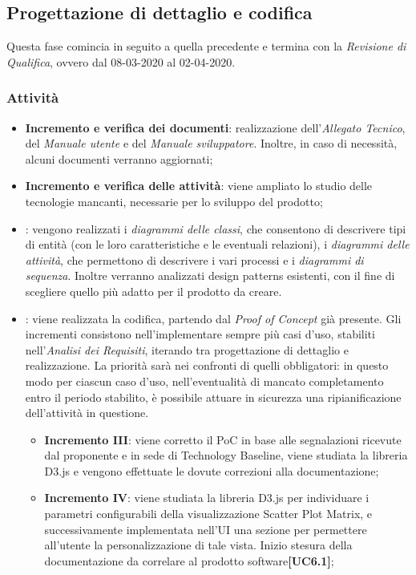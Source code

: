 \subsection{Progettazione di dettaglio e codifica}
Questa fase comincia in seguito a quella precedente e termina con la \textit{Revisione di Qualifica}, ovvero dal 08-03-2020 al 02-04-2020.

\subsubsection{Attività}
\begin{itemize}
	\item \textbf{Incremento e verifica dei documenti}: realizzazione dell'\textit{Allegato Tecnico}, del \textit{Manuale utente} e del \textit{Manuale sviluppatore}. Inoltre, in caso di necessità, alcuni documenti verranno aggiornati;
	\item \textbf{Incremento e verifica delle attività}: viene ampliato lo studio delle tecnologie mancanti, necessarie per lo sviluppo del prodotto; 
	\item \textbf{}: vengono realizzati i \textit{diagrammi delle classi}, che consentono di descrivere tipi di entità (con le loro caratteristiche e le eventuali relazioni), i \textit{diagrammi delle attività}, che permettono di descrivere i vari processi e i \textit{diagrammi di sequenza}. Inoltre verranno analizzati design patterns esistenti, con il fine di scegliere quello più adatto per il prodotto da creare.
	\item \textbf{}: viene realizzata la codifica, partendo dal \textit{Proof of Concept} già presente. Gli incrementi consistono nell'implementare sempre più casi d'uso, stabiliti nell'\textit{Analisi dei Requisiti}, iterando tra progettazione di dettaglio e realizzazione. La priorità sarà nei confronti di quelli obbligatori: in questo modo per ciascun caso d'uso, nell'eventualità di mancato completamento entro il periodo stabilito, è possibile attuare in sicurezza una ripianificazione dell'attività in questione.
	\begin{itemize}
	\item \textbf{Incremento III}: viene corretto il PoC in base alle segnalazioni ricevute dal proponente e in sede di Technology Baseline, viene studiata la libreria D3.js e vengono effettuate le dovute correzioni alla documentazione;
	
	\item \textbf{Incremento IV}: viene studiata la libreria D3.js per individuare i parametri configurabili della visualizzazione Scatter Plot Matrix, e successivamente implementata nell'UI una sezione per permettere all'utente la personalizzazione di tale vista. Inizio stesura della documentazione da correlare al prodotto software\textbf{[UC6.1]};
	

\end{itemize}
\end{itemize}
